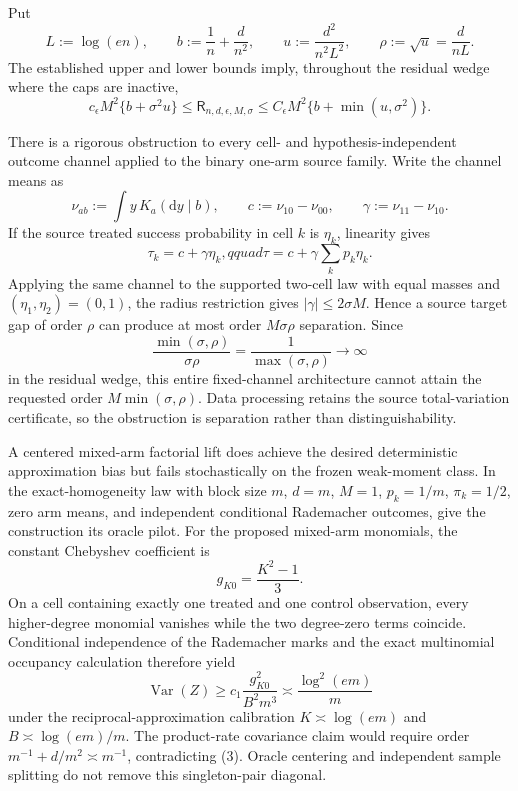 Put
\[
 L:=\log(en),\qquad b:=\frac1n+\frac d{n^2},\qquad
 u:=\frac{d^2}{n^2L^2},\qquad \rho:=\sqrt u=\frac d{nL}.
\]
The established upper and lower bounds imply, throughout the residual wedge where the caps are inactive,
\[
 c_{\epsilon}M^2\{b+\sigma^2u\}
 \le \mathsf R_{n,d,\epsilon,M,\sigma}
 \le C_{\epsilon}M^2\{b+\min(u,\sigma^2)\}.
\tag{1}
\]

There is a rigorous obstruction to every cell- and hypothesis-independent outcome channel applied to the binary one-arm source family.  Write the channel means as
\[
 \nu_{ab}:=\int y\,K_a(\mathrm dy\mid b),\qquad
 c:=\nu_{10}-\nu_{00},\qquad \gamma:=\nu_{11}-\nu_{10}.
\]
If the source treated success probability in cell \(k\) is \(\eta_k\), linearity gives
\[
 \tau_k=c+\gamma\eta_k,qquad
 \tau=c+\gamma\sum_kp_k\eta_k.
\tag{2}
\]
Applying the same channel to the supported two-cell law with equal masses and \((\eta_1,\eta_2)=(0,1)\), the radius restriction gives \(|\gamma|\le2\sigma M\).  Hence a source target gap of order \(\rho\) can produce at most order \(M\sigma\rho\) separation.  Since
\[
 \frac{\min(\sigma,\rho)}{\sigma\rho}
 =\frac1{\max(\sigma,\rho)}\longrightarrow\infty
\]
in the residual wedge, this entire fixed-channel architecture cannot attain the requested order \(M\min(\sigma,\rho)\).  Data processing retains the source total-variation certificate, so the obstruction is separation rather than distinguishability.

A centered mixed-arm factorial lift does achieve the desired deterministic approximation bias but fails stochastically on the frozen weak-moment class.  In the exact-homogeneity law with block size \(m\), \(d=m\), \(M=1\), \(p_k=1/m\), \(\pi_k=1/2\), zero arm means, and independent conditional Rademacher outcomes, give the construction its oracle pilot.  For the proposed mixed-arm monomials, the constant Chebyshev coefficient is
\[
 g_{K0}=\frac{K^2-1}{3}.
\]
On a cell containing exactly one treated and one control observation, every higher-degree monomial vanishes while the two degree-zero terms coincide.  Conditional independence of the Rademacher marks and the exact multinomial occupancy calculation therefore yield
\[
 \operatorname{Var}(Z)
 \ge c_1\frac{g_{K0}^2}{B^2m^3}
 \asymp \frac{\log^2(em)}m
\tag{3}
\]
under the reciprocal-approximation calibration \(K\asymp\log(em)\) and \(B\asymp\log(em)/m\).  The product-rate covariance claim would require order \(m^{-1}+d/m^2\asymp m^{-1}\), contradicting (3).  Oracle centering and independent sample splitting do not remove this singleton-pair diagonal.

